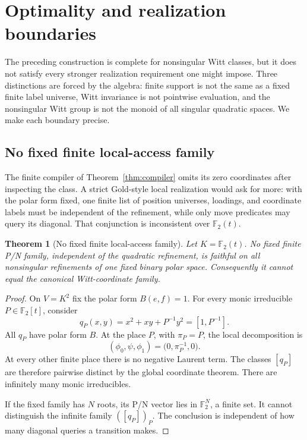 \documentclass[11pt]{article}
\newtheorem{theorem}{Theorem}[section]
\theoremstyle{definition}
\theoremstyle{remark}
\newcommand{\F}{\mathbb{F}}
\begin{document}
\section{Optimality and realization boundaries}

The preceding construction is complete for nonsingular Witt classes, but it
does not satisfy every stronger realization requirement one might impose.
Three distinctions are forced by the algebra: finite support is not the same
as a fixed finite label universe, Witt invariance is not pointwise evaluation,
and the nonsingular Witt group is not the monoid of all singular quadratic
spaces.  We make each boundary precise.

\subsection{No fixed finite local-access family}\label{sec:finite-obstruction}

The finite compiler of Theorem~\ref{thm:compiler} omits its zero coordinates
after inspecting the class.  A strict Gold-style local realization would ask
for more: with the polar form fixed, one finite list of position universes,
loadings, and coordinate labels must be independent of the refinement, while
only move predicates may query its diagonal.  That conjunction is
inconsistent over $\F_2(t)$.

\begin{theorem}[No fixed finite local-access family]
Let $K=\F_2(t)$.  No fixed finite P/N family, independent of the quadratic
refinement, is faithful on all nonsingular refinements of one fixed binary
polar space.  Consequently it cannot equal the canonical Witt-coordinate
family.
\end{theorem}

\begin{proof}
On $V=K^2$ fix the polar form $B(e,f)=1$.  For every monic irreducible
$P\in\F_2[t]$, consider
\[
q_P(x,y)=x^2+xy+P^{-1}y^2=[1,P^{-1}].
\]
All $q_P$ have polar form $B$.  At the place $P$, with $\pi_P=P$, the local
decomposition is
\[
(\phi_0,\psi,\phi_1)
=\bigl(0,\pi_P^{-1},0\bigr).
\]
At every other finite place there is no negative Laurent term.  The classes
$[q_P]$ are therefore pairwise distinct by the global coordinate theorem.
There are infinitely many monic irreducibles.

If the fixed family has $N$ roots, its P/N vector lies in $\F_2^N$, a finite
set.  It cannot distinguish the infinite family $([q_P])_P$.  The conclusion
is independent of how many diagonal queries a transition makes.
\end{proof}
\end{document}
